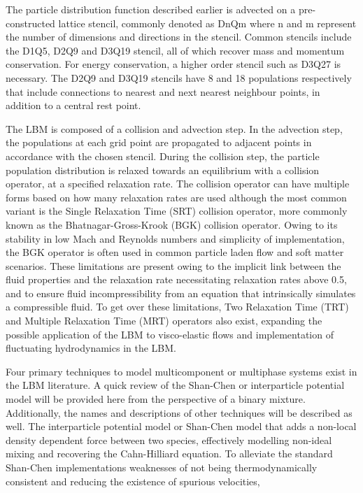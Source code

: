 The particle distribution function described earlier is advected on a pre-constructed lattice stencil, commonly denoted as DnQm where n and m represent the 
number of dimensions and directions in the stencil. Common stencils include the D1Q5, D2Q9 and D3Q19 stencil, all of which recover mass and momentum conservation. 
For energy conservation, a higher order stencil such as D3Q27 is necessary. The D2Q9 and D3Q19 stencils have 8 and 18 populations respectively that include 
connections to nearest and next nearest neighbour points, in addition to a central rest point. 

The LBM is composed of a collision and advection step. In the advection step, the populations at each grid point are propagated to adjacent points in accordance 
with the chosen stencil. During the collision step, the particle population distribution is relaxed towards an equilibrium with a collision operator, at a 
specified relaxation rate. The collision operator can have multiple forms based on how many relaxation rates are used although the most common variant is the 
Single Relaxation Time (SRT) collision operator, more commonly known as the Bhatnagar-Gross-Krook (BGK) collision operator. Owing to its stability in low Mach 
and Reynolds numbers and simplicity of implementation, the BGK operator is often used in common particle laden flow and soft matter scenarios. 
\cite{bhatnagar_model_1954} These limitations are present owing to the implicit link between the fluid properties and the relaxation rate necessitating 
relaxation rates above 0.5, and to ensure fluid incompressibility from an equation that intrinsically simulates a compressible fluid. To get over these 
limitations, Two Relaxation Time (TRT) and Multiple Relaxation Time (MRT) operators also exist, expanding the possible application of the LBM to visco-elastic 
flows and implementation of fluctuating hydrodynamics in the LBM. \cite{liu_simulation_2023, adhikari_fluctuating_2005}

Four primary techniques to model multicomponent or multiphase systems exist in the LBM literature. A quick review of the Shan-Chen or 
interparticle potential model  will be provided here from the perspective of a binary mixture. Additionally, the names and descriptions of 
other techniques will be described as well. The interparticle potential model or Shan-Chen model that adds a non-local density dependent force 
between two species, effectively modelling non-ideal mixing and recovering the Cahn-Hilliard equation. To alleviate the standard Shan-Chen implementations 
weaknesses of not being thermodynamically consistent and reducing the existence of spurious velocities, 

